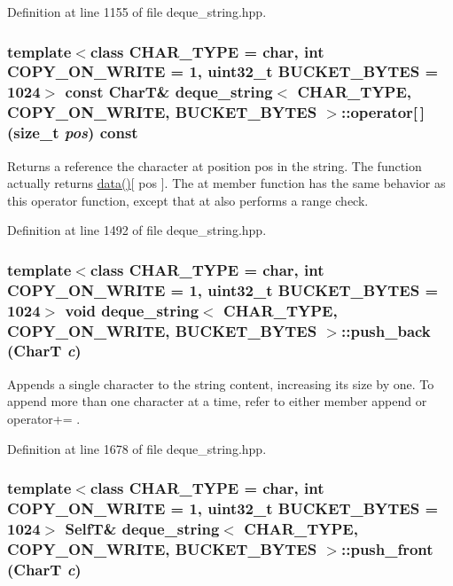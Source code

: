 Definition at line 1155 of file deque\_\-string.hpp.\hypertarget{classdeque__string_88832ed720e934d637d0b8b9205e29a5}{
\subsubsection[{operator[]}]{\setlength{\rightskip}{0pt plus 5cm}template$<$class CHAR\_\-TYPE  = char, int COPY\_\-ON\_\-WRITE = 1, uint32\_\-t BUCKET\_\-BYTES = 1024$>$ const CharT\& {\bf deque\_\-string}$<$ CHAR\_\-TYPE, COPY\_\-ON\_\-WRITE, BUCKET\_\-BYTES $>$::operator\mbox{[}$\,$\mbox{]} (size\_\-t {\em pos}) const}}
\label{classdeque__string_88832ed720e934d637d0b8b9205e29a5}


Returns a reference the character at position pos in the string. The function actually returns \hyperlink{classdeque__string_43d0a5c5653559cee6bd477fce3f0a2c}{data()}\mbox{[} pos \mbox{]}. The at member function has the same behavior as this operator function, except that at also performs a range check. 

Definition at line 1492 of file deque\_\-string.hpp.\hypertarget{classdeque__string_c6bb97ddcf4da6d778782a90dabb1866}{
\subsubsection[{push\_\-back}]{\setlength{\rightskip}{0pt plus 5cm}template$<$class CHAR\_\-TYPE  = char, int COPY\_\-ON\_\-WRITE = 1, uint32\_\-t BUCKET\_\-BYTES = 1024$>$ void {\bf deque\_\-string}$<$ CHAR\_\-TYPE, COPY\_\-ON\_\-WRITE, BUCKET\_\-BYTES $>$::push\_\-back (CharT {\em c})}}
\label{classdeque__string_c6bb97ddcf4da6d778782a90dabb1866}


Appends a single character to the string content, increasing its size by one. To append more than one character at a time, refer to either member append or operator+= . 

Definition at line 1678 of file deque\_\-string.hpp.\hypertarget{classdeque__string_0c68ec4134f82d210d03599c5ec161e8}{
\subsubsection[{push\_\-front}]{\setlength{\rightskip}{0pt plus 5cm}template$<$class CHAR\_\-TYPE  = char, int COPY\_\-ON\_\-WRITE = 1, uint32\_\-t BUCKET\_\-BYTES = 1024$>$ {\bf SelfT}\& {\bf deque\_\-string}$<$ CHAR\_\-TYPE, COPY\_\-ON\_\-WRITE, BUCKET\_\-BYTES $>$::push\_\-front (CharT {\em c})}}
\label{classdeque__string_0c68ec4134f82d210d03599c5ec161e8}


